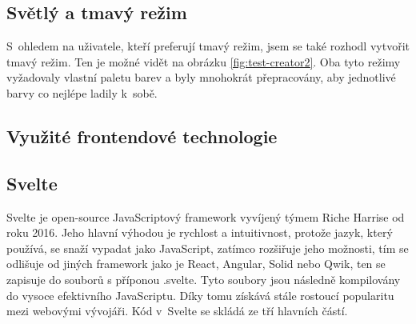 \documentclass[12pt, a4paper,
openright
]{report}
\begin{document}
\subsection{Světlý a tmavý režim}
S~ohledem na uživatele, kteří preferují tmavý režim, jsem se také rozhodl vytvořit tmavý režim. Ten je možné vidět na obrázku \ref{fig:test-creator2}. Oba tyto režimy vyžadovaly vlastní paletu barev a byly mnohokrát přepracovány, aby jednotlivé barvy co nejlépe ladily k~sobě.

\subsection{Využité frontendové technologie}
\clearpage
\subsection{Svelte}
Svelte je open-source JavaScriptový framework vyvíjený týmem Riche Harrise od roku 2016. Jeho hlavní výhodou je rychlost a intuitivnost, protože jazyk, který používá, se snaží vypadat jako JavaScript, zatímco rozšiřuje jeho možnosti, tím se odlišuje od jiných framework jako je React, Angular, Solid nebo Qwik, ten se zapisuje do souborů s příponou .svelte. Tyto soubory jsou následně kompilovány do vysoce efektivního JavaScriptu. Díky tomu získává stále rostoucí popularitu mezi webovými vývojáři. Kód v~Svelte se skládá ze tří hlavních částí.
\end{document}
